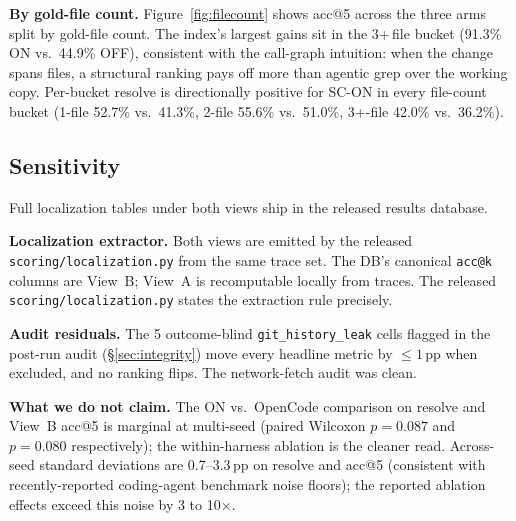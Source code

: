 \textbf{By gold-file count.} Figure~\ref{fig:filecount} shows acc@5 across the three
arms split by gold-file count. The index's largest gains sit in the 3+\,file bucket
(91.3\% ON vs.\ 44.9\% OFF), consistent with the call-graph intuition: when the change
spans files, a structural ranking pays off more than agentic grep over the working copy.
Per-bucket resolve is directionally positive for SC-ON in every file-count bucket
(1-file 52.7\% vs.\ 41.3\%, 2-file 55.6\% vs.\ 51.0\%, 3+-file 42.0\% vs.\ 36.2\%).

\FloatBarrier
\subsection{Sensitivity}
\label{sec:results-sensitivity}

Full localization tables under both views ship in the released results database.

\textbf{Localization extractor.} Both views are emitted by the released
\texttt{scoring/localization.py} from the same trace set. The DB's canonical \texttt{acc@k}
columns are View~B; View~A is recomputable locally from traces.
The released \texttt{scoring/localization.py} states the extraction rule precisely.

\textbf{Audit residuals.} The 5 outcome-blind \texttt{git\_history\_leak} cells flagged
in the post-run audit (\S\ref{sec:integrity}) move every headline metric by $\le 1$\,pp
when excluded, and no ranking flips. The network-fetch audit was clean.

\textbf{What we do not claim.} The ON vs.\ OpenCode comparison on resolve and View~B
acc@5 is marginal at multi-seed (paired Wilcoxon $p=0.087$ and $p=0.080$ respectively);
the within-harness ablation is the cleaner read. Across-seed standard deviations are
0.7--3.3\,pp on resolve and acc@5 (consistent with recently-reported coding-agent
benchmark noise floors); the reported ablation effects exceed this noise by 3 to
10$\times$.
\FloatBarrier
